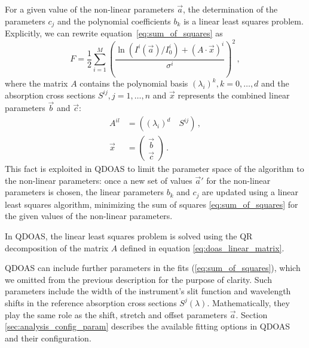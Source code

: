 For a given value of the non-linear parameters $\vec{a}$, the
determination of the parameters $c_j$ and the polynomial coefficients
$b_k$ is a linear least squares problem.  Explicitly, we can rewrite
equation~\eqref{eq:sum_of_squares} as
\begin{equation}
  \label{eq:doas_linear}
  F = \frac{1}{2}\sum_{i=1}^M\left(
    \frac{\ln(I^i(\vec{a})/I^i_0) +  (A \cdot \vec{x})^i}{\sigma^i}
    \right)^2\,,
\end{equation}
where the matrix $A$ contains the polynomial basis $(\lambda_i)^k,
k=0,\ldots,d$ and the absorption cross sections $S^{ij}, j=1,\ldots,n$
and $\vec{x}$ represents the combined linear parameters $\vec{b}$ and
$\vec{c}$:
\begin{align}
  \label{eq:doas_linear_matrix}
  A^{il}  & = \left( (\lambda_i)^d \quad S^{ij} \right)\,,\\
  \vec{x} & = \left( \begin{array}{c}
      \vec{b}\\
      \vec{c}
    \end{array}\right)\,.
\end{align}
This fact is exploited in QDOAS to limit the parameter space of the
algorithm to the non-linear parameters: once a new set of values
$\vec{a}'$ for the non-linear parameters is chosen, the linear
parameters $b_k$ and $c_j$ are updated using a linear least squares
algorithm, minimizing the sum of squares \eqref{eq:sum_of_squares} for
the given values of the non-linear parameters.

In QDOAS, the linear least squares problem is solved using the QR
decomposition of the matrix $A$ defined in equation
\eqref{eq:doas_linear_matrix}.

QDOAS can include further parameters in the fits
(\ref{eq:sum_of_squares}), which we omitted from the previous
description for the purpose of clarity.  Such parameters include the
width of the instrument's slit function and wavelength shifts in the
reference absorption cross sections $S^j(\lambda)$.  Mathematically,
they play the same role as the shift, stretch and offset parameters
$\vec{a}$.  Section \ref{sec:analysis_config_param} describes the
available fitting options in QDOAS and their
configuration.

